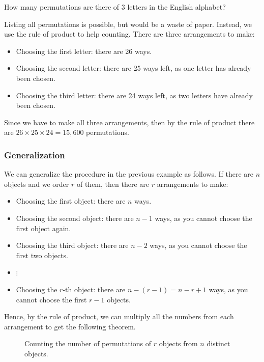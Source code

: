 \begin{frame}[t]
\begin{ex}
How many permutations are there of 3 letters in the English alphabet?
\end{ex}
\begin{sol}
Listing all permutations is possible, but would be a waste of paper. Instead, we use the rule of product to help counting. There are three arrangements to make:
\begin{itemize}
\item Choosing the first letter: there are 26 ways.
\item Choosing the second letter: there are 25 ways left, as one letter has already been chosen.
\item Choosing the third letter: there are 24 ways left, as two letters have already been chosen.
\end{itemize}
Since we have to make all three arrangements, then by the rule of product there are $26 \times 25 \times 24 = 15,600$ permutations.
\end{sol}
\end{frame}

\begin{frame}[t]
\frametitle{Generalization}
\begin{slide}
We can generalize the procedure in the previous example as follows. If there are $n$ objects and we order $r$ of them, then there are $r$ arrangements to make:
\begin{itemize}
\item Choosing the first object: there are $n$ ways.
\item Choosing the second object: there are $n-1$ ways, as you cannot choose the first object again.
\item Choosing the third object: there are $n-2$ ways, as you cannot choose the first two objects.
\item $\vdots$
\item Choosing the $r$-th object: there are $n-(r-1) = n-r+1$ ways, as you cannot choose the first $r-1$ objects.
\end{itemize}
Hence, by the rule of product, we can multiply all the numbers from each arrangement to get the following theorem.
\end{slide}
\end{frame}

\begin{frame}{}
\begin{figure}[h!]
\caption{Counting the number of permutations of $r$ objects from $n$ distinct objects.}
\end{figure}
\end{frame}

